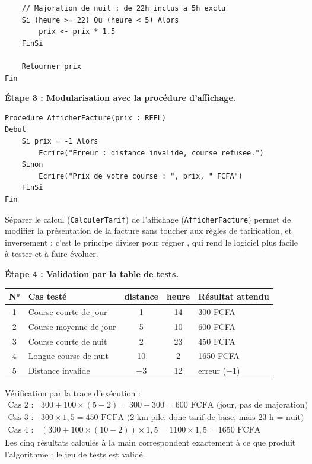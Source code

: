\documentclass[11pt]{article}
\begin{document}
\begin{exoresolu}
\begin{lstlisting}
    // Majoration de nuit : de 22h inclus a 5h exclu
    Si (heure >= 22) Ou (heure < 5) Alors
        prix <- prix * 1.5
    FinSi

    Retourner prix
Fin
\end{lstlisting}

\textbf{Étape 3 : Modularisation avec la procédure d'affichage.}\par
\begin{lstlisting}
Procedure AfficherFacture(prix : REEL)
Debut
    Si prix = -1 Alors
        Ecrire("Erreur : distance invalide, course refusee.")
    Sinon
        Ecrire("Prix de votre course : ", prix, " FCFA")
    FinSi
Fin
\end{lstlisting}
Séparer le calcul (\texttt{CalculerTarif}) de l'affichage (\texttt{AfficherFacture}) permet de modifier la présentation de la facture sans toucher aux règles de tarification, et inversement : c'est le principe \og diviser pour régner \fg, qui rend le logiciel plus facile à tester et à faire évoluer.

\medskip
\textbf{Étape 4 : Validation par la table de tests.}\par
\begin{center}
\begin{tabularx}{\linewidth}{|c|l|c|c|X|}
\hline
\rowcolor{popblueL}
\textbf{N°} & \textbf{Cas testé} & \textbf{distance} & \textbf{heure} & \textbf{Résultat attendu} \\
\hline
1 & Course courte de jour & \num{1} & \num{14} & \num{300} FCFA \\
\hline
2 & Course moyenne de jour & \num{5} & \num{10} & \num{600} FCFA \\
\hline
3 & Course courte de nuit & \num{2} & \num{23} & \num{450} FCFA \\
\hline
4 & Longue course de nuit & \num{10} & \num{2} & \num{1650} FCFA \\
\hline
5 & Distance invalide & \num{-3} & \num{12} & erreur ($-1$) \\
\hline
\end{tabularx}
\end{center}

Vérification par la trace d'exécution :
\begin{align*}
\text{Cas 2 : } & 300 + 100 \times (5 - 2) = 300 + 300 = 600 \text{ FCFA (jour, pas de majoration)} \\
\text{Cas 3 : } & 300 \times 1{,}5 = 450 \text{ FCFA (2 km pile, donc tarif de base, mais 23 h = nuit)} \\
\text{Cas 4 : } & (300 + 100 \times (10 - 2)) \times 1{,}5 = 1100 \times 1{,}5 = 1650 \text{ FCFA}
\end{align*}
Les cinq résultats calculés à la main correspondent exactement à ce que produit l'algorithme : le jeu de tests est validé.


\end{exoresolu}
\end{document}
